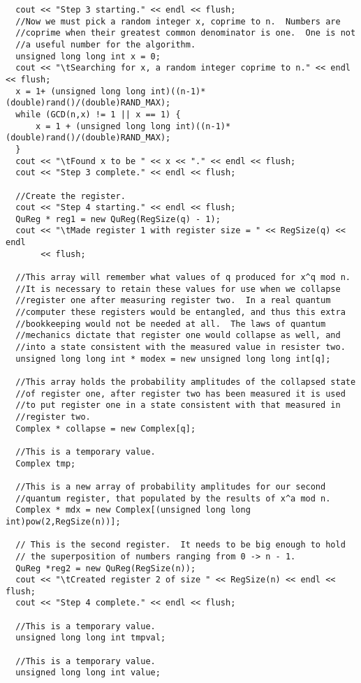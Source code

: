 \documentclass[]{article}
\begin{document}
\begin{verbatim}
  cout << "Step 3 starting." << endl << flush;
  //Now we must pick a random integer x, coprime to n.  Numbers are
  //coprime when their greatest common denominator is one.  One is not
  //a useful number for the algorithm.
  unsigned long long int x = 0;
  cout << "\tSearching for x, a random integer coprime to n." << endl << flush;
  x = 1+ (unsigned long long int)((n-1)*(double)rand()/(double)RAND_MAX);
  while (GCD(n,x) != 1 || x == 1) {
      x = 1 + (unsigned long long int)((n-1)*(double)rand()/(double)RAND_MAX);
  }
  cout << "\tFound x to be " << x << "." << endl << flush;
  cout << "Step 3 complete." << endl << flush;
  
  //Create the register.
  cout << "Step 4 starting." << endl << flush;
  QuReg * reg1 = new QuReg(RegSize(q) - 1);
  cout << "\tMade register 1 with register size = " << RegSize(q) << endl 
       << flush;  

  //This array will remember what values of q produced for x^q mod n.
  //It is necessary to retain these values for use when we collapse
  //register one after measuring register two.  In a real quantum
  //computer these registers would be entangled, and thus this extra
  //bookkeeping would not be needed at all.  The laws of quantum
  //mechanics dictate that register one would collapse as well, and
  //into a state consistent with the measured value in resister two.
  unsigned long long int * modex = new unsigned long long int[q];     

  //This array holds the probability amplitudes of the collapsed state
  //of register one, after register two has been measured it is used
  //to put register one in a state consistent with that measured in
  //register two.
  Complex * collapse = new Complex[q];

  //This is a temporary value.
  Complex tmp;
  
  //This is a new array of probability amplitudes for our second
  //quantum register, that populated by the results of x^a mod n.
  Complex * mdx = new Complex[(unsigned long long int)pow(2,RegSize(n))]; 
  
  // This is the second register.  It needs to be big enough to hold
  // the superposition of numbers ranging from 0 -> n - 1.
  QuReg *reg2 = new QuReg(RegSize(n)); 
  cout << "\tCreated register 2 of size " << RegSize(n) << endl << flush;
  cout << "Step 4 complete." << endl << flush;

  //This is a temporary value.
  unsigned long long int tmpval;
  
  //This is a temporary value.
  unsigned long long int value;
  

\end{verbatim}
\end{document}
